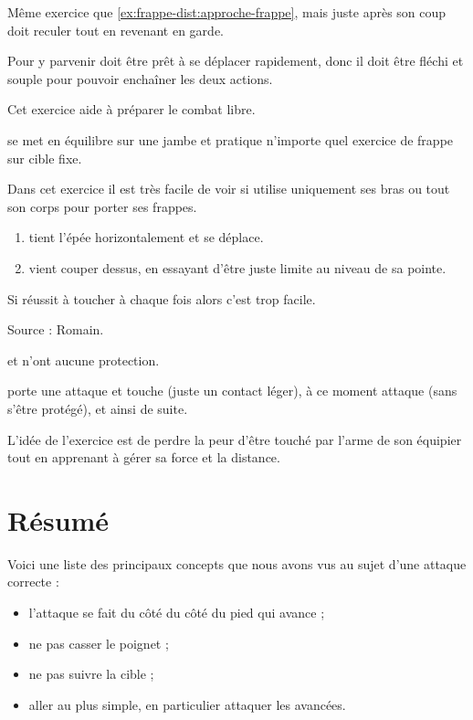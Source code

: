 \begin{exercice}
\label{ex:frappe-dist:approche-croix-aleat-garde}

Même exercice que \ref{ex:frappe-dist:approche-frappe}, mais juste après son coup \A doit reculer tout en revenant en garde.

Pour y parvenir \A doit être prêt à se déplacer rapidement, donc il doit être fléchi et souple pour pouvoir enchaîner les deux actions.

Cet exercice aide à préparer le combat libre.

\end{exercice}


\begin{exercice}
\A se met en équilibre sur une jambe et pratique n'importe quel exercice de frappe sur cible fixe.

Dans cet exercice il est très facile de voir si \A utilise uniquement ses bras ou tout son corps pour porter ses frappes.
\end{exercice}


\begin{exercice}

\begin{enumerate}
	\item \D tient l'épée horizontalement et se déplace.
	
	\item \A vient couper dessus, en essayant d'être juste limite au niveau de sa pointe.
\end{enumerate}

Si \A réussit à toucher à chaque fois alors c'est trop facile.

Source : Romain.

\end{exercice}


\begin{exercice}
\A et \D n'ont aucune protection.

\A porte une attaque et touche \D (juste un contact léger), à ce moment \D attaque \A (sans s'être protégé), et ainsi de suite.

L'idée de l'exercice est de perdre la peur d'être touché par l'arme de son équipier tout en apprenant à gérer sa force et la distance.
\end{exercice}


\section{Résumé}


\noindent
Voici une liste des principaux concepts que nous avons vus au sujet d'une attaque correcte :
\begin{itemize}
	\item l'attaque se fait du côté du côté du pied qui avance ;
	\item ne pas casser le poignet ;
	\item ne pas suivre la cible ;
	\item aller au plus simple, en particulier attaquer les avancées.
\end{itemize}


